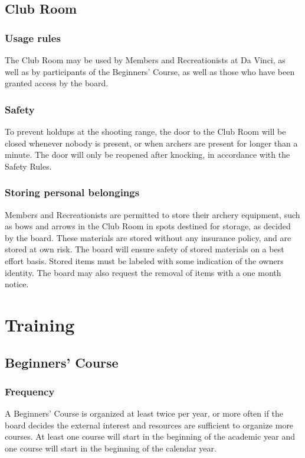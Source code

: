 \documentclass[a4paper]{article}
\newcommand{\Asr}{Safety Rules} %
\begin{document}
\subsection{Club Room}
\subsubsection{Usage rules}
The Club Room may be used by Members and Recreationists at Da Vinci, as well as by participants of the Beginners' Course, as well as those who have been granted access by the board. 

\subsubsection{Safety}
To prevent holdups at the shooting range, the door to the Club Room will be closed whenever nobody is present, or when archers are present for longer than a minute. The door will only be reopened after knocking, in accordance with the \Asr .

\subsubsection{Storing personal belongings}
Members and Recreationists are permitted to store their archery equipment, such as bows and arrows in the Club Room in spots destined for storage, as decided by the board. These materials are stored without any insurance policy, and are stored at own risk. The board will ensure safety of stored materials on a best effort basis. Stored items must be labeled with some indication of the owners identity. The board may also request the removal of items with a one month notice.


\section{Training}
\subsection{Beginners' Course}
\subsubsection{Frequency}
A Beginners' Course is organized at least twice per year, or more often if the board decides the external interest and resources are sufficient to organize more courses. At least one course will start in the beginning of the academic year and one course will start in the beginning of the calendar year.
\end{document}
